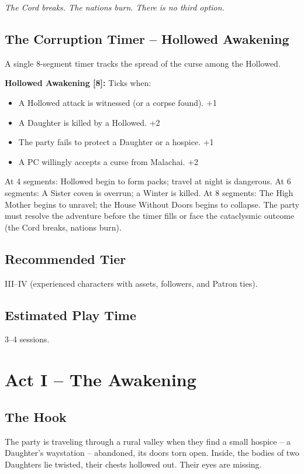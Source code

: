 \documentclass[10pt,twoside]{book}
\begin{document}
\textit{The Cord breaks. The nations burn. There is no third option.}

\section{The Corruption Timer -- Hollowed Awakening}
A single 8-segment timer tracks the spread of the curse among the Hollowed.

\textbf{Hollowed Awakening [8]:} Ticks when:
\begin{itemize}
\item A Hollowed attack is witnessed (or a corpse found). +1
\item A Daughter is killed by a Hollowed. +2
\item The party fails to protect a Daughter or a hospice. +1
\item A PC willingly accepts a curse from Malachai. +2
\end{itemize}
At 4 segments: Hollowed begin to form packs; travel at night is dangerous.  
At 6 segments: A Sister coven is overrun; a Winter is killed.  
At 8 segments: The High Mother begins to unravel; the House Without Doors begins to collapse. The party must resolve the adventure before the timer fills or face the cataclysmic outcome (the Cord breaks, nations burn).

\section{Recommended Tier}
III--IV (experienced characters with assets, followers, and Patron ties).

\section{Estimated Play Time}
3--4 sessions.

\chapter{Act I -- The Awakening}

\section{The Hook}
The party is traveling through a rural valley when they find a small hospice -- a Daughter's waystation -- abandoned, its doors torn open. Inside, the bodies of two Daughters lie twisted, their chests hollowed out. Their eyes are missing.
\end{document}
